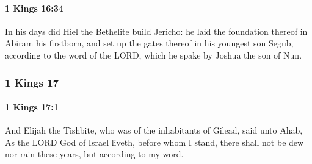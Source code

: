 		\paragraph{1 Kings 16:34} %
			\label{1KINGS-16-34}

			In his days did Hiel the Bethelite build Jericho: he laid the foundation thereof in Abiram his firstborn, and set up the gates thereof in his youngest son Segub, according to the word of the LORD, which he spake by Joshua the son of Nun.

	\subsubsection{1 Kings 17} %
		\label{1KINGS-17}

		\paragraph{1 Kings 17:1} %
			\label{1KINGS-17-1}

			And Elijah the Tishbite, who was of the inhabitants of Gilead, said unto Ahab, As the LORD God of Israel liveth, before whom I stand, there shall not be dew nor rain these years, but according to my word.

